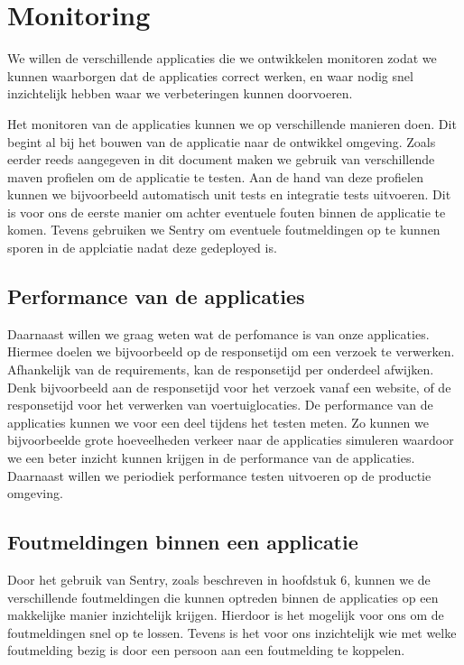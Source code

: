 \chapter{Monitoring}
We willen de verschillende applicaties die we ontwikkelen monitoren zodat we kunnen waarborgen dat de applicaties correct werken, en waar nodig snel inzichtelijk hebben waar we verbeteringen kunnen doorvoeren.

Het monitoren van de applicaties kunnen we op verschillende manieren doen. Dit begint al bij het bouwen van de applicatie naar de ontwikkel omgeving. Zoals eerder reeds aangegeven in dit document maken we gebruik van verschillende maven profielen om de applicatie te testen. Aan de hand van deze profielen kunnen we bijvoorbeeld automatisch unit tests en integratie tests uitvoeren. Dit is voor ons de eerste manier om achter eventuele fouten binnen de applicatie te komen.
Tevens gebruiken we Sentry om eventuele foutmeldingen op te kunnen sporen in de applciatie nadat deze gedeployed is.

\section{Performance van de applicaties}
Daarnaast willen we graag weten wat de perfomance is van onze applicaties. Hiermee doelen we bijvoorbeeld op de responsetijd om een verzoek te verwerken. Afhankelijk van de requirements, kan de responsetijd per onderdeel afwijken. Denk bijvoorbeeld aan de responsetijd voor het verzoek vanaf een website, of de responsetijd voor het verwerken van voertuiglocaties.
De performance van de applicaties kunnen we voor een deel tijdens het testen meten. Zo kunnen we bijvoorbeelde grote hoeveelheden verkeer naar de applicaties simuleren waardoor we een beter inzicht kunnen krijgen in de performance van de applicaties.
Daarnaast willen we periodiek performance testen uitvoeren op de productie omgeving.

\section{Foutmeldingen binnen een applicatie}
Door het gebruik van Sentry, zoals beschreven in hoofdstuk 6, kunnen we de verschillende foutmeldingen die kunnen optreden binnen de applicaties op een makkelijke manier inzichtelijk krijgen. Hierdoor is het mogelijk voor ons om de foutmeldingen snel op te lossen. Tevens is het voor ons inzichtelijk wie met welke foutmelding bezig is door een persoon aan een foutmelding te koppelen.

